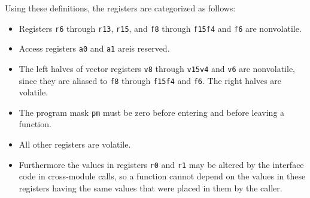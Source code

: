 \documentclass[USenglish,fontsize=11pt,twoside,%
  toc=bib,toc=idx,toc=graduated,numbers=noendperiod,
  bookmarks=true,
  bookmarksnumbered=true,
  bookmarksopen=true,
  bookmarksopenlevel=1,
  breaklinks=true,
  colorlinks=true,
  linkcolor=black,
  pdfpagelayout={TwoPageRight},
  pdfusetitle=true
]{scrreprt}
\begin{document}
Using these definitions, the registers are categorized as follows:
\begin{itemize}
\item Registers \texttt{r6} through \texttt{r13}, \texttt{r15},
  {\ifzseries and \texttt{f8} through \texttt{f15}\else \texttt{f4}
    and \texttt{f6}\fi} are nonvolatile.
\item Access register{\ifzseries s\fi} \texttt{a0} {\ifzseries and
    \texttt{a1} are\else is\fi} reserved.
\item The left halves of vector registers {\ifzseries \texttt{v8} through
    \texttt{v15}\else \texttt{v4} and \texttt{v6}\fi} are nonvolatile,
  since they are aliased to {\ifzseries \texttt{f8} through
    \texttt{f15}\else \texttt{f4} and \texttt{f6}\fi}.  The right halves
  are volatile.
\item The program mask \texttt{pm} must be zero before entering and before
  leaving a function.
\item All other registers are volatile.
\item Furthermore the values in registers \texttt{r0} and \texttt{r1}
  may be altered by the interface code in cross-module calls, so a
  function cannot depend on the values in these registers having the
  same values that were placed in them by the caller.
\end{itemize}
\end{document}
